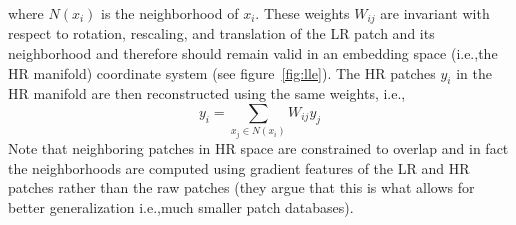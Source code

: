 where \(N(x_i)\) is the neighborhood of \(x_i\).
%
These weights \(W_{ij}\) are invariant with respect to rotation, rescaling, and translation of the LR patch and its neighborhood\cite{saul2000introduction} and therefore should remain valid in an embedding space (i.e.,the HR manifold) coordinate system (see figure~\ref{fig:lle}).
%
The HR patches \(y_i\) in the HR manifold are then reconstructed using the same weights, i.e.,\begin{equation}
	y_i = \sum_{x_j \in N(x_i)} W_{ij} y_j
\end{equation}
%
Note that neighboring patches in HR space are constrained to overlap and in fact the neighborhoods are computed using gradient features of the LR and HR patches rather than the raw patches (they argue that this is what allows for better generalization i.e.,much smaller patch databases).
